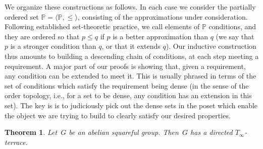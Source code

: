 \documentclass[12pt,a4paper]{article}
\newtheorem{thm}{Theorem}[section]
\renewcommand{\P}{\mathbb{P}}
\begin{document}
We organize these constructions as follows. In each case we consider the partially ordered set $\P=\langle \P, \leq\rangle$, consisting of the approximations under consideration. Following established set-theoretic practice, we call elements of $\P$ conditions, and they are ordered so that $p\leq q$ if $p$ is a better approximation than $q$ (we say that $p$ is a stronger condition than $q$, or that it extends $q$).  Our inductive construction thus amounts to building a descending chain of conditions, at each step meeting a requirement. A major part of our proofs is showing that, given a requirement, any condition can be extended to meet it. This is usually phrased in terms of the set of conditions which satisfy the requirement being dense (in the sense of the order topology, i.e., for a set to be dense, any condition has an extension in this set). The key is is to judiciously pick out the dense sets in the poset which enable the object we are trying to build to clearly satisfy our desired properties.

\begin{thm}\label{th:T_infty}
Let~$G$ be an abelian squareful group. Then~$G$ has a directed $T_{\infty}$-terrace.
\end{thm}
\end{document}
